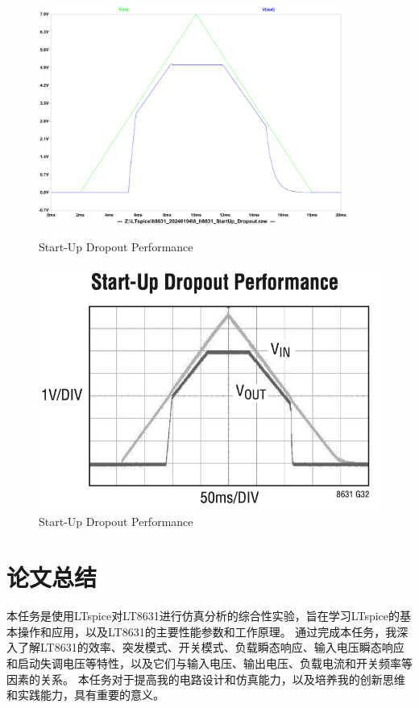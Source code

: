 \documentclass[lang=cn,10pt]{elegantbook}
\begin{document}
\begin{figure}[htbp]
    \centering\begin{minipage}[t]{0.48\textwidth}
        \centering\includegraphics[page=1, width=0.9\textwidth]{figure/6_lt8631_StartUp_Dropout_1.pdf}
        \caption{Start-Up Dropout Performance}
    \end{minipage}
    \centering\begin{minipage}[t]{0.48\textwidth}
        \centering\includegraphics[width=0.9\linewidth]{figure/datasheet_G32.png}
        \caption{Start-Up Dropout Performance}
    \end{minipage}
\end{figure}

\chapter{论文总结}

本任务是使用LTspice对LT8631进行仿真分析的综合性实验，旨在学习LTspice的基本操作和应用，以及LT8631的主要性能参数和工作原理。
通过完成本任务，我深入了解LT8631的效率、突发模式、开关模式、负载瞬态响应、输入电压瞬态响应和启动失调电压等特性，以及它们与输入电压、输出电压、负载电流和开关频率等因素的关系。
本任务对于提高我的电路设计和仿真能力，以及培养我的创新思维和实践能力，具有重要的意义。
\end{document}
